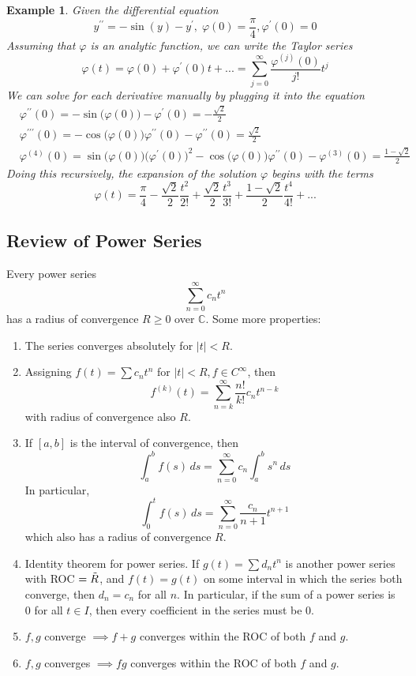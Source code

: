 \documentclass{article}
\newtheorem{example}{Example}[section]
\theoremstyle{remark}
\theoremstyle{definition}
\begin{document}
  \begin{example}
  Given the differential equation
  \[y^{\prime \prime} = -\sin{(y)} - y^\prime, \; \varphi(0) = \frac{\pi}{4}, \varphi^\prime (0) = 0\]
  Assuming that $\varphi$ is an analytic function, we can write the Taylor series 
  \[\varphi(t) = \varphi(0) + \varphi^\prime (0) t + ... = \sum_{j=0}^\infty \frac{\varphi^{(j)} (0)}{j!} t^j\]
  We can solve for each derivative manually by plugging it into the equation
  \begin{align*}
      & \varphi^{\prime\prime} (0) = -\sin{\big( \varphi(0)\big)} - \varphi^\prime (0) = - \frac{\sqrt{2}}{2} \\
      & \varphi^{\prime\prime\prime} (0) = -\cos{\big(\varphi(0)\big)} \varphi^{\prime\prime}(0) - \varphi^{\prime\prime} (0) = \frac{\sqrt{2}}{2} \\
      & \varphi^{(4)} (0) = \sin{\Big(\varphi(0)\big)} \big( \varphi^\prime (0)\big)^2 - \cos{\Big(\varphi(0)\big)} \varphi^{\prime\prime} (0) - \varphi^{(3)} (0) = \frac{1-\sqrt{2}}{2}
  \end{align*}
  Doing this recursively, the expansion of the solution $\varphi$ begins with the terms 
  \[\varphi(t) = \frac{\pi}{4} - \frac{\sqrt{2}}{2} \frac{t^2}{2!} + \frac{\sqrt{2}}{2} \frac{t^3}{3!} + \frac{1-\sqrt{2}}{2} \frac{t^4}{4!} + ...\]
  \end{example}

  \subsection{Review of Power Series}

    Every power series 
    \[\sum_{n=0}^\infty c_n t^n\]
    has a radius of convergence $R \geq 0$ over $\mathbb{C}$. Some more properties: 
    \begin{enumerate}
        \item The series converges absolutely for $|t| < R$. 
        \item Assigning $f(t) = \sum c_n t^n$ for $|t| < R, f \in C^\infty$, then 
        \[f^{(k)}(t) = \sum_{n=k}^\infty \frac{n!}{k!} c_n t^{n-k}\]
        with radius of convergence also $R$.
        \item If $[a, b]$ is the interval of convergence, then 
        \[\int_a^b f(s) \,ds = \sum_{n=0}^\infty c_n \int_a^b s^n \, ds\]
        In particular, 
        \[\int_0^t f(s)\,ds = \sum_{n=0}^\infty \frac{c_n}{n+1} t^{n+1}\]
        which also has a radius of convergence $R$. 
        \item Identity theorem for power series. If $g(t) = \sum d_n t^n$ is another power series with ROC $= \Tilde{R}$, and $f(t) = g(t)$ on some interval in which the series both converge, then $d_n = c_n$ for all $n$. In particular, if the sum of a power series is $0$ for all $t \in I$, then every coefficient in the series must be $0$. 
        \item $f, g$ converge $\implies f+g$ converges within the ROC of both $f$ and $g$. 
        \item $f, g$ converges $\implies fg$ converges within the ROC of both $f$ and $g$. 
    \end{enumerate}
\end{document}
